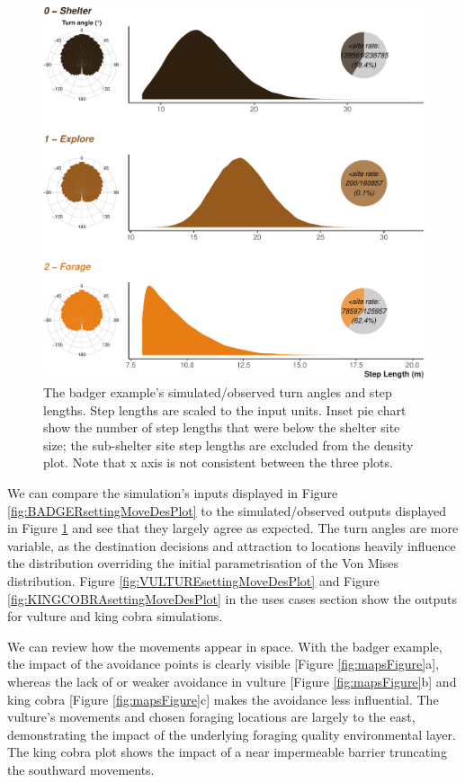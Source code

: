 \documentclass[10pt,a4paper]{article}
\begin{document}
\begin{figure}

{\centering \includegraphics{Agent-based_model_walkthrough_files/figure-latex/BADGERmoveCharFigure-1} 

}

\caption{The badger example's simulated/observed turn angles and step lengths. Step lengths are scaled to the input units. Inset pie chart show the number of step lengths that were below the shelter site size; the sub-shelter site step lengths are excluded from the density plot. Note that x axis is not consistent between the three plots.}\label{fig:BADGERmoveCharFigure}
\end{figure}

We can compare the simulation's inputs displayed in Figure \ref{fig:BADGERsettingMoveDesPlot} to the simulated/observed outputs displayed in Figure \ref{fig:BADGERmoveCharFigure} and see that they largely agree as expected.
The turn angles are more variable, as the destination decisions and attraction to locations heavily influence the distribution overriding the initial parametrisation of the Von Mises distribution.
Figure \ref{fig:VULTUREsettingMoveDesPlot} and Figure \ref{fig:KINGCOBRAsettingMoveDesPlot} in the uses cases section show the outputs for vulture and king cobra simulations.

We can review how the movements appear in space.
With the badger example, the impact of the avoidance points is clearly visible {[}Figure \ref{fig:mapsFigure}a{]}, whereas the lack of or weaker avoidance in vulture {[}Figure \ref{fig:mapsFigure}b{]} and king cobra {[}Figure \ref{fig:mapsFigure}c{]} makes the avoidance less influential.
The vulture's movements and chosen foraging locations are largely to the east, demonstrating the impact of the underlying foraging quality environmental layer.
The king cobra plot shows the impact of a near impermeable barrier truncating the southward movements.
\end{document}
